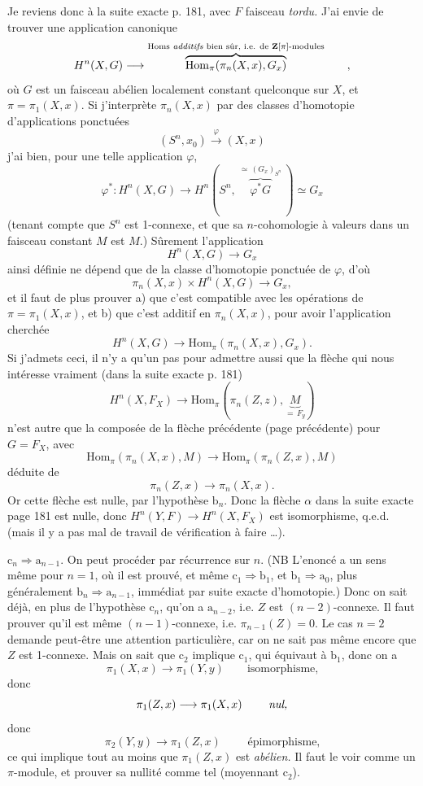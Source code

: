 \documentclass[11pt]{article}
\newcommand{\printedpage}[1]{\marginpar{\footnotesize p.~#1}}
\newcommand{\msp}[1]{\marginpar{\footnotesize [#1]}}
\begin{document}
Je reviens donc à la suite exacte p. 181, avec $F$ faisceau \textit{tordu.} J’ai envie de trouver une application canonique
\[
H^n(X,G) \longrightarrow \overbrace{\mathrm{Hom}_\pi(\pi_n(X,x),G_x)}^{\text{\scriptsize Homs \textit{additifs} bien sûr, i.e. de $\mathbf{Z}[\pi]$-modules}} \qquad ,
\]
où $G$ est un faisceau abélien localement constant quelconque sur $X$, et $\pi = \pi_1(X,x)$. Si j’interprète
\msp{page 184}
$\pi_n(X,x)$ par des classes d’homotopie d’applications ponctuées
\[
(S^n,x_0) \xrightarrow{\ \varphi\ } (X,x)
\]
j’ai bien, pour une telle application $\varphi$,
\[
\varphi^* : H^n(X,G) \longrightarrow H^n(S^n,\ \overbrace{\varphi^*G}^{\simeq\,(G_x)_{S^n}}\ ) \simeq G_x
\]
(tenant compte que $S^n$ est 1-connexe, et que sa $n$-cohomologie à valeurs dans un faisceau constant $M$ est $M$.) Sûrement l’application
\[
H^n(X,G) \longrightarrow G_x
\]
\printedpage{123}
ainsi définie ne dépend que de la classe d’homotopie ponctuée de $\varphi$, d’où
\[
\pi_n(X,x) \times H^n(X,G) \longrightarrow G_x,
\]
et il faut de plus prouver a) que c’est compatible avec les opérations de $\pi = \pi_1(X,x)$, et b) que c’est additif en $\pi_n(X,x)$, pour avoir l’application cherchée
\[
H^n(X,G) \longrightarrow \mathrm{Hom}_\pi(\pi_n(X,x),G_x).
\]
Si j’admets ceci, il n’y a qu’un pas pour admettre aussi que la flèche qui nous intéresse vraiment (dans la suite exacte p. 181)
\msp{page 185}
\[
H^n(X,F_X) \longrightarrow \mathrm{Hom}_\pi(\pi_n(Z,z),\underbrace{M}_{=\,F_y})
\]
n’est autre que la composée de la flèche précédente (page précédente) pour $G = F_X$, avec
\[
\mathrm{Hom}_\pi(\pi_n(X,x),M) \longrightarrow \mathrm{Hom}_\pi(\pi_n(Z,x),M)
\]
déduite de
\[
\pi_n(Z,x) \longrightarrow \pi_n(X,x).
\]
Or cette flèche est nulle, par l’hypothèse $\mathrm{b}_n$. Donc la flèche $\alpha$ dans la suite exacte page 181 est nulle, donc $H^n(Y,F) \longrightarrow H^n(X,F_X)$ est isomorphisme, q.e.d. (mais il y a pas mal de travail de vérification à faire \dots).

$\mathrm{c}_n \Longrightarrow \mathrm{a}_{n-1}$. On peut procéder par récurrence sur $n$. (NB L’enoncé a un sens même pour $n=1$, où il est prouvé, et même $\mathrm{c}_1 \Longrightarrow \mathrm{b}_1$, et $\mathrm{b}_1 \Longrightarrow \mathrm{a}_0$, plus généralement $\mathrm{b}_n \Longrightarrow \mathrm{a}_{n-1}$, immédiat par suite exacte d’homotopie.) Donc on sait déjà, en plus de l’hypothèse $\mathrm{c}_n$, qu’on a $\mathrm{a}_{n-2}$, i.e. $Z$ est $(n-2)$-connexe. Il faut prouver qu’il est même $(n-1)$-connexe, i.e. $\pi_{n-1}(Z)=0$. Le cas $n=2$ demande %
\msp{page 186}
peut-être une attention particulière, car on ne sait pas même encore que $Z$ est 1-connexe. Mais on sait que $\mathrm{c}_2$ implique $\mathrm{c}_1$, qui équivaut à $\mathrm{b}_1$, donc on a
\[
\pi_1(X,x) \longrightarrow \pi_1(Y,y) \qquad \text{isomorphisme,}
\]
donc
\[
\pi_1(Z,x) \longrightarrow \pi_1(X,x) \qquad \text{ \textit{nul,}}
\]
donc
\[
\pi_2(Y,y) \longrightarrow \pi_1(Z,x) \qquad \text{ épimorphisme,}
\]
ce qui implique tout au moins que $\pi_1(Z,x)$ est \textit{abélien.} Il faut le voir comme un $\pi$-module, et prouver sa nullité comme tel (moyennant $\mathrm{c}_2$).
\end{document}
